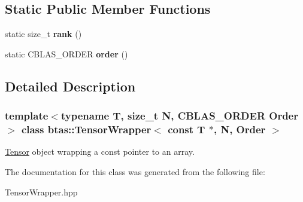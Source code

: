\subsection*{Static Public Member Functions}
\begin{DoxyCompactItemize}
\item 
\hypertarget{classbtas_1_1_tensor_wrapper_3_01const_01_t_01_5_00_01_n_00_01_order_01_4_a011fb28c4f9b7f6696a91c7556f06111}{
static size\_\-t {\bfseries rank} ()}
\label{classbtas_1_1_tensor_wrapper_3_01const_01_t_01_5_00_01_n_00_01_order_01_4_a011fb28c4f9b7f6696a91c7556f06111}

\item 
\hypertarget{classbtas_1_1_tensor_wrapper_3_01const_01_t_01_5_00_01_n_00_01_order_01_4_a36e60e706037923b27a87ee05711c039}{
static CBLAS\_\-ORDER {\bfseries order} ()}
\label{classbtas_1_1_tensor_wrapper_3_01const_01_t_01_5_00_01_n_00_01_order_01_4_a36e60e706037923b27a87ee05711c039}

\end{DoxyCompactItemize}


\subsection{Detailed Description}
\subsubsection*{template$<$typename T, size\_\-t N, CBLAS\_\-ORDER Order$>$ class btas::TensorWrapper$<$ const T $\ast$, N, Order $>$}

\hyperlink{classbtas_1_1_tensor}{Tensor} object wrapping a const pointer to an array. 

The documentation for this class was generated from the following file:\begin{DoxyCompactItemize}
\item 
TensorWrapper.hpp\end{DoxyCompactItemize}
